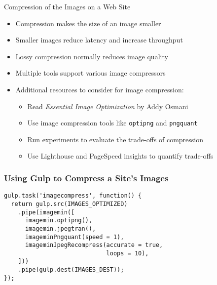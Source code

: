 \documentclass[14pt,aspectratio=169]{beamer}
\begin{document}
%
\begin{frame}{Compression of the Images on a Web Site}
  \begin{itemize}
    \item Compression makes the size of an image smaller
      \vspace*{-.2in}
    \item Smaller images reduce latency and increase throughput
      \vspace*{-.2in}
    \item Lossy compression normally reduces image quality
      \vspace*{-.2in}
    \item Multiple tools support various image compressors
      \vspace*{-.2in}
    \item Additional resources to consider for image compression:
      \begin{itemize}
        \item Read {\em Essential Image Optimization} by Addy Osmani
        \item Use image compression tools like {\tt optipng} and {\tt pngquant}
        \item Run experiments to evaluate the trade-offs of compression
        \item Use Lighthouse and PageSpeed insights to quantify trade-offs
      \end{itemize}
  \end{itemize}
\end{frame}

%
\begin{frame}[fragile]
  \frametitle{Using Gulp to Compress a Site's Images}
  \normalsize
  \begin{minipage}{6in}
    \vspace*{.05in}
    \begin{verbatim}
gulp.task('imagecompress', function() {
  return gulp.src(IMAGES_OPTIMIZED)
    .pipe(imagemin([
      imagemin.optipng(),
      imagemin.jpegtran(),
      imageminPngquant(speed = 1),
      imageminJpegRecompress(accurate = true,
                             loops = 10),
    ]))
    .pipe(gulp.dest(IMAGES_DEST));
});
    \end{verbatim}
  \end{minipage}
\end{frame}
\end{document}
